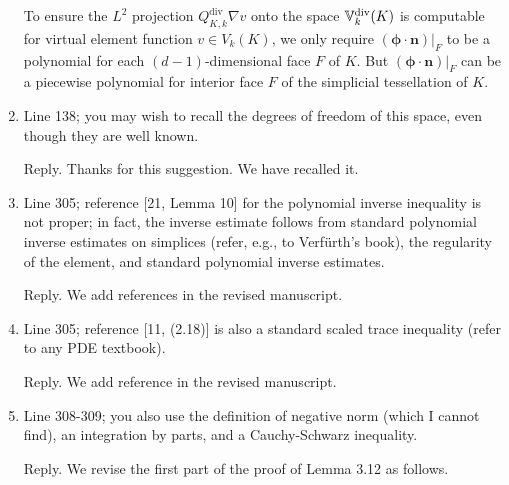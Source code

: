 \documentclass[10pt]{amsart}
\theoremstyle{definition}
\theoremstyle{remark}
\renewcommand{\div}{\operatorname{div}}
\begin{document}
\begin{enumerate}[1.]
To ensure the $L^2$ projection
$Q_{K,k}^{\div}\nabla v$ onto the space $\mathbb{V}_{k}^{\rm div}(K)$ is computable
for virtual element function $v\in V_k(K)$, we only require
$(\boldsymbol{\phi}\cdot\boldsymbol{n})|_F$ to be a polynomial for each $(d-1)$-dimensional face $F$ of $K$. But $(\boldsymbol{\phi}\cdot\boldsymbol{n})|_F$ can be a piecewise polynomial for interior face $F$ of the simplicial tessellation of $K$.


\medskip

\item \textsf{Line 138; you may wish to recall the degrees of freedom of this space, even though they are well known.}

\smallskip \noindent \textcolor[rgb]{1.00,0.00,0.00}{Reply.}
Thanks for this suggestion. We have recalled it.


\medskip

\item \textsf{Line 305; reference [21, Lemma 10] for the polynomial inverse inequality is not proper; in fact, the inverse estimate follows from standard polynomial inverse estimates on simplices (refer, e.g., to Verf{\"u}rth's book), the regularity of the element, and standard polynomial inverse estimates.}

\smallskip \noindent \textcolor[rgb]{1.00,0.00,0.00}{Reply.}
We add references \cite{Ciarlet1978,Verfuerth2013} in the revised manuscript.

\medskip

\item \textsf{Line 305; reference [11, (2.18)] is also a standard scaled trace inequality (refer to any PDE textbook).}

\smallskip \noindent \textcolor[rgb]{1.00,0.00,0.00}{Reply.}
We add reference \cite[Theorem 1.5.1.10]{Grisvard1985} in the revised manuscript.

\medskip

\item \textsf{Line 308-309; you also use the definition of negative norm (which I cannot find), an integration by parts, and a Cauchy-Schwarz inequality.}

\smallskip \noindent \textcolor[rgb]{1.00,0.00,0.00}{Reply.}
We revise the first part of the proof of Lemma 3.12 as follows.


\end{enumerate}
\end{document}

